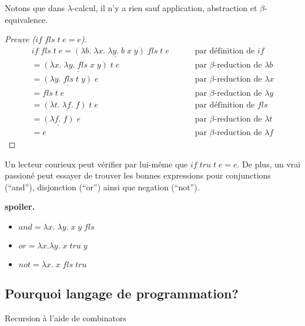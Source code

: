 \documentclass[12pt, a4paper]{article}
\begin{document}
Notons que dans $\lambda$-calcul, il n'y a rien sauf application, abstraction et $\beta$-equivalence.
\begin{proof}[Preuve ($if \; fls \; t \; e = e$)]
	\begin{eqnarray*}
		if \; fls \; t \; e
		= \underline{(\lambda b. \; \lambda x. \; \lambda y. \; b \; x \; y) \; fls} \; t \; e
			& \qquad \text{ par définition de $if$}\\ 
		= \underline{(\lambda x. \; \lambda y. \; fls \; x \; y) \; t} \; e
			& \qquad \text{ par $\beta$-reduction de $\lambda b$}\\
		= \underline{(\lambda y. \; fls \; t \; y)} \; e
			& \qquad \text{ par $\beta$-reduction de $\lambda x$}\\
		= fls \; t \; e
			& \qquad \text{ par $\beta$-reduction de $\lambda y$}\\
		= \underline{(\lambda t. \; \lambda f. \; f) \; t} \; e
			& \qquad \text{ par définition de $fls$}\\
		= \underline{(\lambda f. \; f)} \; e
			& \qquad \text{ par $\beta$-reduction de $\lambda t$}\\
		= e
			& \qquad \text{ par $\beta$-reduction de $\lambda f$}
	\end{eqnarray*}
\end{proof}
Un lecteur courieux peut vérifier par lui-même que $if \; tru \; t \; e = e$.
De plus, un vrai passioné peut essayer de trouver les bonnes expressions pour conjunctions (``and''), disjonction (``or'') ainsi que negation (``not'').

\textbf{spoiler.} 
\begin{itemize}
	\item $and = \lambda x. \; \lambda y. \; x \; y \; fls$
	\item $or = \lambda x. \lambda y. \; x \; tru \; y$
	\item $not = \lambda x. \; x \; fls \; tru$
\end{itemize}

\subsection*{Pourquoi langage de programmation?}
Recursion à l'aide de combinators
\end{document}
